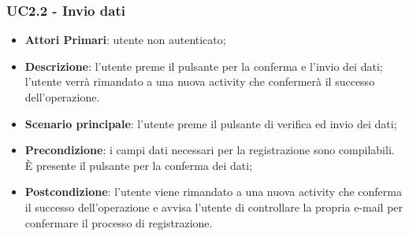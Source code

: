 \subsubsection{UC2.2 - Invio dati}
\begin{itemize}
	\item \textbf{Attori Primari}: utente non autenticato;
	\item \textbf{Descrizione}: l'utente preme il pulsante per la conferma e l'invio dei dati; l'utente verrà rimandato a una nuova activity che confermerà il successo dell'operazione.
	\item \textbf{Scenario principale}: l'utente preme il pulsante di verifica ed invio dei dati;	
	\item \textbf{Precondizione}: i campi dati necessari per la registrazione sono compilabili. È presente il pulsante per la conferma dei dati;
	\item \textbf{Postcondizione}: l'utente viene rimandato a una nuova activity che conferma il successo dell'operazione e avvisa l'utente di controllare la propria e-mail per confermare il processo di registrazione.
\end{itemize}


